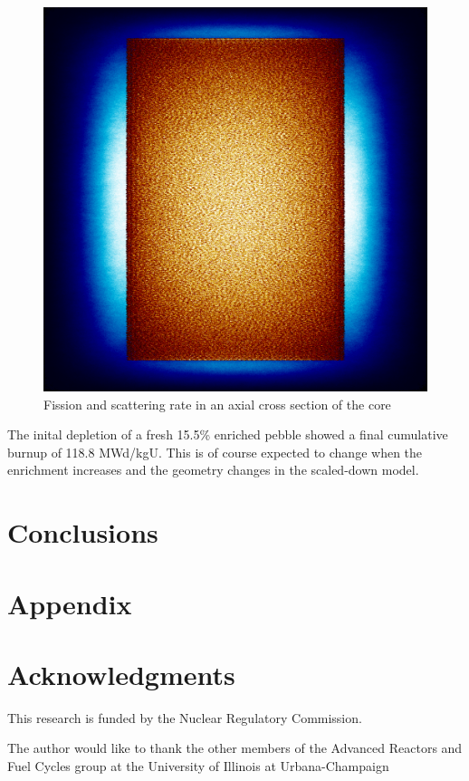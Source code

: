 \documentclass{anstrans}
\begin{document}
\begin{figure}[H]
  \centering
  \includegraphics[width = \linewidth]{htgr-mr-full-core-radial-mesh}
  \caption{Fission and scattering rate in an axial cross section of the core}
  \label{fig:axial-fission-scatter}
\end{figure}

The inital depletion of a fresh 15.5\% enriched pebble showed a final cumulative burnup of 118.8 MWd/kgU.  This is of course expected to change when the enrichment increases and the geometry changes in the scaled-down model.



\section{Conclusions}


\appendix
\section{Appendix}


\section{Acknowledgments}
This research is funded by the Nuclear Regulatory Commission.

The author would like to thank the other members of the Advanced Reactors and Fuel Cycles group at the University of Illinois at Urbana-Champaign



\end{document}
